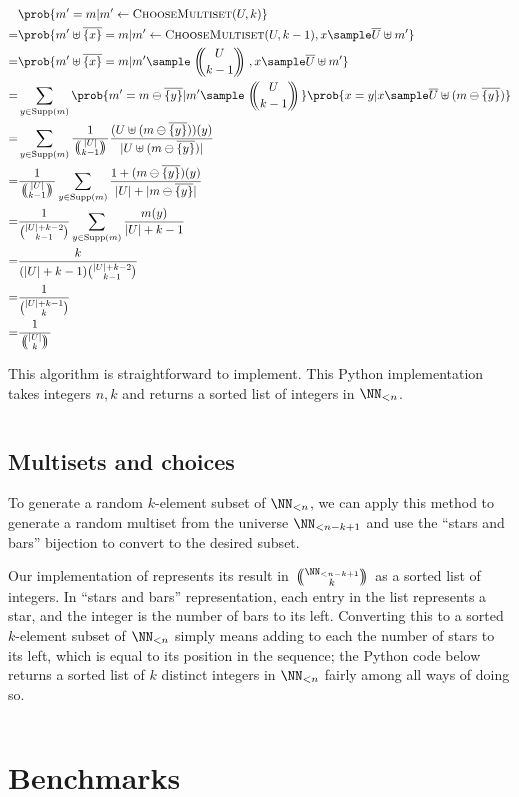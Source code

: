\documentclass[letterpaper,luatex,11pt]{article}
\newcommand{\multichoose}[2]{
\left.\mathchoice
  {\left(\kern-0.48em\binom{#1}{#2}\kern-0.48em\right)}
  {\big(\kern-0.30em\binom{\smash{#1}}{\smash{#2}}\kern-0.30em\big)}
  {\left(\kern-0.30em\binom{\smash{#1}}{\smash{#2}}\kern-0.30em\right)}
  {\left(\kern-0.30em\binom{\smash{#1}}{\smash{#2}}\kern-0.30em\right)}
\right.}
\DeclareMathOperator{\Supp}{Supp}
\begin{document}
\begin{align*}
    &\prob{m' = m | m' \leftarrow \textproc{ChooseMultiset}(U, k)}
    \\
    =&
    \prob{m' \uplus \overline{\{x\}} = m
        | m' \leftarrow \textproc{ChooseMultiset}(U, k-1), x \sample \overline{U} \uplus m'}
    \\
    =&
    \prob{m' \uplus \overline{\{x\}} = m
        | m' \sample \multichoose{U}{k - 1}, x \sample \overline{U} \uplus m'}
    \\
    =&
    \sum_{y \in \Supp(m)}
    \prob{m' = m \ominus \overline{\{y\}} | m' \sample \multichoose{U}{k - 1}}
    \prob{x = y | x \sample \overline{U} \uplus (m \ominus \overline{\{y\}})}
    \\
    =&
    \sum_{y \in \Supp(m)}
    \frac{1}{\multichoose{|U|}{k - 1}}
    \frac{(U \uplus (m \ominus \overline{\{y\}}))(y)}{|U \uplus (m \ominus \overline{\{y\}})|}
    \\
    =&
    \frac{1}{\multichoose{|U|}{k - 1}}
    \sum_{y \in \Supp(m)}
    \frac{1 + (m \ominus \overline{\{y\}})(y)}{|U| + |m \ominus \overline{\{y\}}|}
    \\
    =&
    \frac{1}{\binom{|U| + k - 2}{k-1}}
    \sum_{y \in \Supp(m)}
    \frac{m(y)}{|U| + k -1}
    \\
    =& \frac{k}{(|U| + k -1)\binom{|U| + k - 2}{k-1}}
    \\
    =& \frac{1}{\binom{|U| + k - 1}{k}}
    \\
    =& \frac{1}{\multichoose{|U|}{k}}
\end{align*}

This algorithm is straightforward to implement. This Python implementation takes integers
$n, k$ and returns a sorted list of integers in \(\NN_{<n}\).

\inputminted{Python}{choose_multiset.py}

\subsection{Multisets and choices}


To generate a random \(k\)-element subset of \(\NN_{<n}\),
we can apply this method to generate a random multiset from the universe \(\NN_{<n-k + 1}\)
and use the ``stars and bars'' bijection to convert to the desired subset.

Our implementation of 
represents its result in \(\multichoose{\NN_{<n-k + 1}}{k}\) as a sorted list of integers.
In ``stars and bars'' representation,
each entry in the list represents a star, and the integer is the number of bars to its left.
Converting this to a sorted \(k\)-element subset of \(\NN_{<n}\) simply means adding to each
the number of stars to its left, which is equal to its position in the sequence; the Python code
below returns a sorted list of $k$ distinct integers in \(\NN_{<n}\) fairly among all ways
of doing so.

\inputminted{Python}{choose_binom.py}

\section{Benchmarks}

\printbibliography
\end{document}
